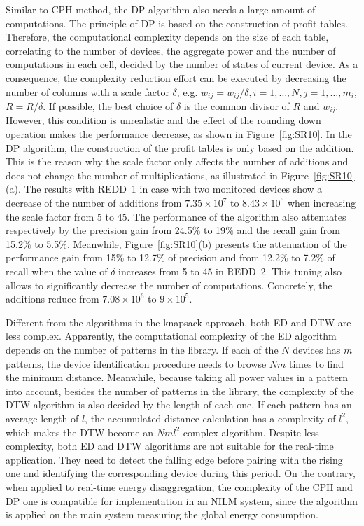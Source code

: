 Similar to CPH method, the DP algorithm also needs a large amount of computations. The principle of DP is based on the construction of profit tables. Therefore, the computational complexity depends on the size of each table, correlating to the number of devices, the aggregate power and the number of computations in each cell, decided by the number of states of current device. As a consequence, the complexity reduction effort can be executed by decreasing the number of columns with a scale factor $\delta$, e.g. $w_{ij} = w_{ij}/\delta,i=1,\ldots,N,j=1,\ldots,m_i$, $R = R/\delta$. If possible, the best choice of $\delta$ is the common divisor of $R$ and $w_{ij}$. However, this condition is unrealistic and the effect of the rounding down operation makes the performance decrease, as shown in Figure~\ref{fig:SR10}.
In the DP algorithm, the construction of the profit tables is only based on the addition. This is the reason why the scale factor only affects the number of additions and does not change the number of multiplications, as illustrated in Figure~\ref{fig:SR10}(a). The results with REDD~1 in case with two monitored devices show a decrease of the number of additions from $7.35\times 10^7$ to $8.43\times 10^6$ when increasing the scale factor from 5 to 45. The performance of the algorithm also attenuates respectively by the precision gain from 24.5$\%$ to 19$\%$ and the recall gain from 15.2$\%$ to 5.5$\%$. Meanwhile, Figure~\ref{fig:SR10}(b) presents the attenuation of the performance gain from 15$\%$ to 12.7$\%$ of precision and from 12.2$\%$ to 7.2$\%$ of recall when the value of $\delta$ increases from 5 to 45 in REDD~2. This tuning also allows to significantly decrease the number of computations. Concretely, the additions reduce from $7.08\times 10^6$ to $9\times 10^5$.

Different from the algorithms in the knapsack approach, both ED and DTW are less complex. Apparently, the computational complexity of the ED algorithm depends on the number of patterns in the library. If each of the $N$ devices has $m$ patterns, the device identification procedure needs to browse $Nm$ times to find the minimum distance. Meanwhile, because taking all power values in a pattern into account, besides the number of patterns in the library, the complexity of the DTW algorithm is also decided by the length of each one. If each pattern has an average length of $l$, the accumulated distance calculation has a complexity of $l^2$, which makes the DTW become an $Nml^2$-complex algorithm. 
Despite less complexity, both ED and DTW algorithms are not suitable for the real-time application. They need to detect the falling edge before pairing with the rising one and identifying the corresponding device during this period. On the contrary, when applied to real-time energy disaggregation, the complexity of the CPH and DP one is compatible for implementation in an NILM system, since the algorithm is applied on the main system measuring the global energy consumption.



